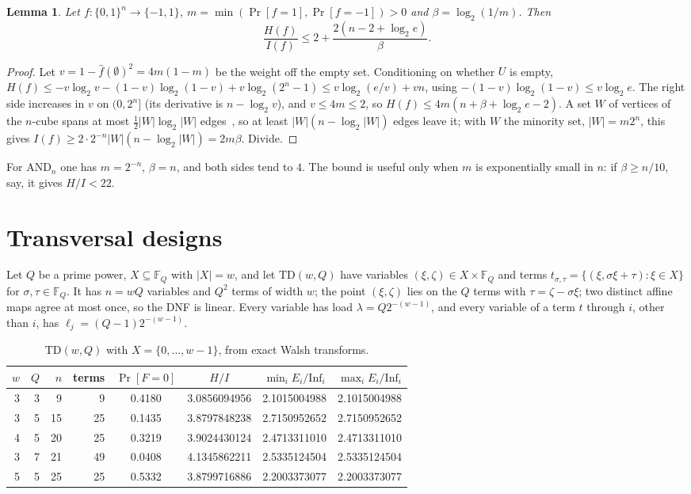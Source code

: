 \documentclass[11pt]{amsart}
\newtheorem{lemma}[theorem]{Lemma}
\theoremstyle{remark}
\newcommand{\Inf}{\mathrm{Inf}}
\begin{document}
\begin{lemma}\label{lem:bias}
Let $f\colon\{0,1\}^n\to\{-1,1\}$, $m=\min(\Pr[f=1],\Pr[f=-1])>0$ and $\beta=\log_2(1/m)$. Then
\[
\frac{H(f)}{I(f)}\le2+\frac{2(n-2+\log_2e)}\beta.
\]
\end{lemma}

\begin{proof}
Let $v=1-\hat f(\emptyset)^2=4m(1-m)$ be the weight off the empty set. Conditioning on whether $U$ is empty,
$H(f)\le-v\log_2v-(1-v)\log_2(1-v)+v\log_2(2^n-1)\le v\log_2(e/v)+vn$, using $-(1-v)\log_2(1-v)\le v\log_2e$. The right side increases
in $v$ on $(0,2^n]$ (its derivative is $n-\log_2v$), and $v\le4m\le2$, so $H(f)\le4m(n+\beta+\log_2e-2)$. A set $W$ of vertices of the $n$-cube spans at most
$\frac12|W|\log_2|W|$ edges~\cite{Harper,Hart}, so at least $|W|(n-\log_2|W|)$ edges leave it; with $W$ the minority set,
$|W|=m2^n$, this gives $I(f)\ge2\cdot2^{-n}|W|(n-\log_2|W|)=2m\beta$. Divide.
\end{proof}

For $\mathrm{AND}_n$ one has $m=2^{-n}$, $\beta=n$, and both sides tend to $4$. The bound is useful only when $m$ is
exponentially small in $n$: if $\beta\ge n/10$, say, it gives $H/I<22$.

\section{Transversal designs}\label{sec:td}

Let $Q$ be a prime power, $X\subseteq\mathbb F_Q$ with $|X|=w$, and let $\mathrm{TD}(w,Q)$ have variables $(\xi,\zeta)\in
X\times\mathbb F_Q$ and terms $t_{\sigma,\tau}=\{(\xi,\sigma\xi+\tau):\xi\in X\}$ for $\sigma,\tau\in\mathbb F_Q$. It has $n=wQ$ variables and $Q^2$
terms of width $w$; the point $(\xi,\zeta)$ lies on the $Q$ terms with $\tau=\zeta-\sigma\xi$; two distinct affine maps agree at most once,
so the DNF is linear. Every variable has load $\lambda=Q2^{-(w-1)}$, and every variable of a term $t$ through $i$, other
than $i$, has $\ell_j=(Q-1)2^{-(w-1)}$.

\begin{table}[tbp]
\centering
\begin{tabular}{rrrrcccc}
\toprule
$w$ & $Q$ & $n$ & terms & $\Pr[F=0]$ & $H/I$ & $\min_iE_i/\Inf_i$ & $\max_iE_i/\Inf_i$\\\midrule
3 & 3 & 9 & 9 & 0.4180 & 3.0856094956 & 2.1015004988 & 2.1015004988\\
3 & 5 & 15 & 25 & 0.1435 & 3.8797848238 & 2.7150952652 & 2.7150952652\\
4 & 5 & 20 & 25 & 0.3219 & 3.9024430124 & 2.4713311010 & 2.4713311010\\
3 & 7 & 21 & 49 & 0.0408 & 4.1345862211 & 2.5335124504 & 2.5335124504\\
5 & 5 & 25 & 25 & 0.5332 & 3.8799716886 & 2.2003373077 & 2.2003373077\\
\bottomrule
\end{tabular}
\caption{$\mathrm{TD}(w,Q)$ with $X=\{0,\dots,w-1\}$, from exact Walsh transforms.}\label{tab:td}
\end{table}
\end{document}
